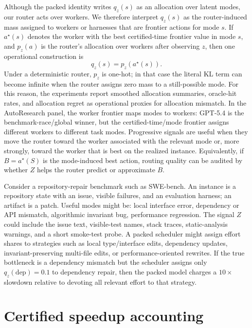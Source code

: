 \documentclass{article}
\newcounter{algorithm}
\begin{document}
{\color{green!50!black}
Although the packed identity writes \(q_z(s)\) as an allocation over latent modes, our router acts over workers.
We therefore interpret \(q_z(s)\) as the router-induced mass assigned to workers or harnesses that are frontier actions for mode \(s\).
If \(a^\star(s)\) denotes the worker with the best certified-time frontier value in mode \(s\), and \(p_z(a)\) is the router's allocation over workers after observing \(z\), then one operational construction is
\[
q_z(s)=p_z(a^\star(s)).
\]
Under a deterministic router, \(p_z\) is one-hot; in that case the literal KL term can become infinite when the router assigns zero mass to a still-possible mode.
For this reason, the experiments report smoothed allocation summaries, oracle-hit rates, and allocation regret as operational proxies for allocation mismatch.
In the AutoResearch panel, the worker frontier maps modes to workers: GPT-5.4 is the benchmark-race/global winner, but the certified-time/mode frontier assigns different workers to different task modes.
Progressive signals are useful when they move the router toward the worker associated with the relevant mode or, more strongly, toward the worker that is best on the realized instance.
Equivalently, if \(B=a^\star(S)\) is the mode-induced best action, routing quality can be audited by whether \(Z\) helps the router predict or approximate \(B\).
}

Consider a repository-repair benchmark such as SWE-bench.  An instance is a repository
state with an issue, visible failures, and an evaluation harness; an artifact is a patch.
Useful modes might be: local interface error, dependency or API mismatch, algorithmic invariant bug, performance regression.
The signal \(Z\) could include the issue text, visible-test names, stack traces, static-analysis
warnings, and a short smoke-test probe.  A packed scheduler might assign effort shares to
strategies such as local type/interface edits, dependency updates, invariant-preserving
multi-file edits, or performance-oriented rewrites.  If the true bottleneck is a dependency
mismatch but the scheduler assigns only \(q_z(\mathrm{dep})=0.1\) to dependency repair,
then the packed model charges a \(10\times\) slowdown relative to devoting all relevant
effort to that strategy.

\section{Certified speedup accounting}
\label{sec:accounting}
\end{document}
